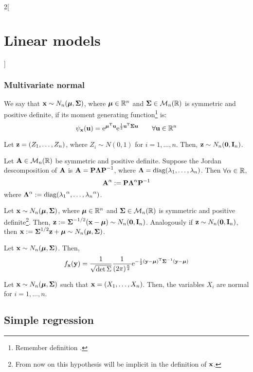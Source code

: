 \documentclass[../../../main_math.tex]{subfiles}
\begin{document}
\begin{multicols}{2}[\section{Linear models}]
  \subsubsection{Multivariate normal}
  \begin{definition}
    We say that $\vf{x}\sim N_n(\vf\mu,\vf\Sigma)$, where $\vf\mu\in\RR^n$ and $\vf\Sigma\in\mathcal{M}_n(\RR)$ is symmetric and positive definite, if its moment generating function\footnote{Remember definition .} is: $$\psi_{\vf{x}}(\vf{u})=\exp{\transpose{\vf{\mu}}\vf{u}}\exp{\frac{1}{2}\transpose{\vf{u}}\vf\Sigma\vf{u}}\qquad\forall\vf{u}\in\RR^n$$
  \end{definition}
  \begin{proposition}
    Let $\vf{z}=(Z_1,\ldots,Z_n)$, where $Z_i\sim N(0,1)$ for $i=1,\ldots,n$. Then, $\vf{z}\sim N_n(\vf{0},\vf{I}_n)$.
  \end{proposition}
  \begin{definition}
    Let $\vf{A}\in\mathcal{M}_n(\RR)$ be symmetric and positive definite. Suppose the Jordan descomposition of $\vf{A}$ is $\vf{A}=\vf{P}\vf{\Lambda}\vf{P}^{-1}$, where $\vf{\Lambda}=\diag(\lambda_1,\ldots,\lambda_n)$. Then $\forall \alpha\in\RR$, $$\vf{A}^\alpha:=\vf{P}\vf{\Lambda}^\alpha\vf{P}^{-1}$$ where $\vf{\Lambda}^\alpha:=\diag({\lambda_1}^\alpha,\ldots,{\lambda_n}^\alpha)$.
  \end{definition}
  \begin{proposition}
    Let $\vf{x}\sim N_n(\vf\mu,\vf\Sigma)$, where $\vf\mu\in\RR^n$ and $\vf\Sigma\in\mathcal{M}_n(\RR)$ is symmetric and positive definite\footnote{From now on this hypothesis will be implicit in the definition of $\vf{x}$.}. Then, $\vf{z}:={\vf\Sigma}^{-1/2}(\vf{x}-\vf{\mu})\sim N_n(\vf{0},\vf{I}_n)$.
    Analogously if $\vf{z}\sim N_n(\vf{0},\vf{I}_n)$, then $\vf{x}:={\vf\Sigma}^{1/2}\vf{z}+\vf\mu\sim N_n(\vf\mu,\vf\Sigma)$.
  \end{proposition}
  \begin{proposition}
    Let $\vf{x}\sim N_n(\vf\mu,\vf\Sigma)$. Then, $$f_{\vf{x}}(\vf{y})=\frac{1}{\sqrt{\det\Sigma}}\frac{1}{(2\pi)^{\frac{n}{2}}}\exp{-\frac{1}{2}\transpose{(\vf{y}-\vf\mu)}{\vf\Sigma}^{-1}(\vf{y}-\vf\mu)}$$
  \end{proposition}
  \begin{proposition}
    Let $\vf{x}\sim N_n(\vf\mu,\vf\Sigma)$ such that $\vf{x}=(X_1,\ldots,X_n)$. Then, the variables $X_i$ are normal for $i=1,\ldots,n$.
  \end{proposition}
  \subsection{Simple regression}

\end{multicols}
\end{document}
